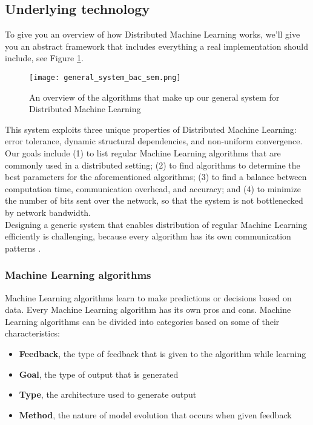\subsection{Underlying technology}
To give you an overview of how Distributed Machine Learning works, we'll give you an abstract framework that includes everything a real implementation should include, see Figure \ref{overview_system}.\\
\begin{figure}[H]
	\texttt{[image: general\_system\_bac\_sem.png]}
	\caption{An overview of the algorithms that make up our general system for Distributed Machine Learning}
	\label{overview_system}
\end{figure}
This system exploits three unique properties of Distributed Machine Learning: error tolerance, dynamic structural dependencies, and non-uniform convergence.\cite{Xing16}\\
Our goals include (1) to list regular Machine Learning algorithms that are commonly used in a distributed setting; (2) to find algorithms to determine the best parameters for the aforementioned algorithms; (3) to find a balance between computation time, communication overhead, and accuracy; and (4) to minimize the number of bits sent over the network, so that the system is not bottlenecked by network bandwidth.\\
Designing a generic system that enables distribution of  regular Machine Learning efficiently is challenging, because every algorithm has its own communication patterns \cite{Jia14}\cite{Newman09}\cite{Rich13}\cite{Smola10}\cite{Takac13}\cite{Tsi12}.

\subsubsection{Machine Learning algorithms}
Machine Learning algorithms learn to make predictions or decisions based on data. Every Machine Learning algorithm has its own pros and cons. Machine Learning algorithms can be divided into categories based on some of their characteristics:
\begin{itemize}
	\item \textbf{Feedback}, the type of feedback that is given to the algorithm while learning
	\item \textbf{Goal}, the type of output that is generated
	\item \textbf{Type}, the architecture used to generate output
	\item \textbf{Method}, the nature of model evolution that occurs when given feedback
\end{itemize}

